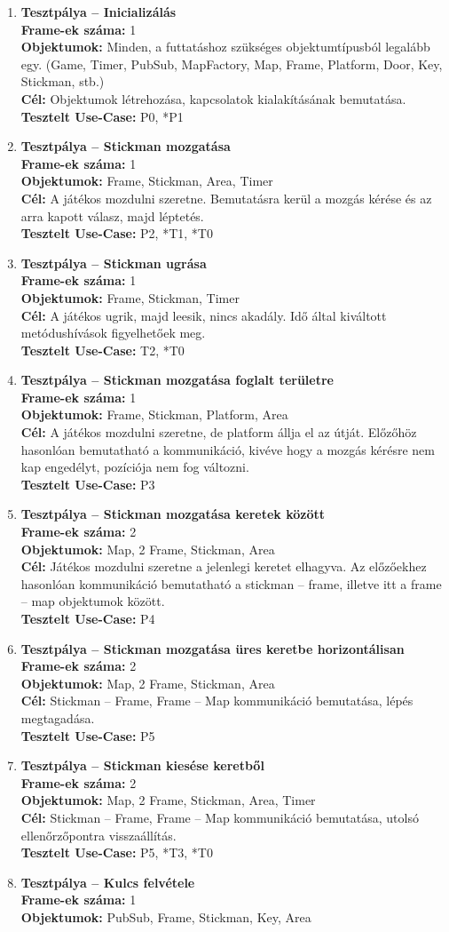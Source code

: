 		\begin{enumerate}[label=\textbf{\arabic*.}, start=0]
		
			\newcommand{\testitem}[1]{\item \textbf{Tesztpálya -- #1}\\}
			\newcommand{\tframe}[1]{\textbf{Frame-ek száma:} #1\\}
			\newcommand{\tobjekt}[1]{\textbf{Objektumok:} #1\\}
			\newcommand{\tcel}[1]{\textbf{Cél:} #1\\}
			\newcommand{\tuse}[1]{\textbf{Tesztelt Use-Case:} #1\\}
		
			\testitem{Inicializálás}
				\tframe{1}
				\tobjekt{Minden, a futtatáshoz szükséges objektumtípusból legalább egy.
					(Game, Timer, PubSub, MapFactory, Map, Frame, Platform, Door, Key, Stickman, stb.)}
				\tcel{Objektumok létrehozása, kapcsolatok kialakításának bemutatása.}
				\tuse{P0, *P1}
			\testitem{Stickman mozgatása}
				\tframe{1}
				\tobjekt{Frame, Stickman, Area, Timer}
				\tcel{A játékos mozdulni szeretne. Bemutatásra kerül a mozgás kérése és az arra kapott válasz, majd léptetés.} 
				\tuse{P2, *T1, *T0}
			\testitem{Stickman ugrása}
				\tframe{1}
				\tobjekt{Frame, Stickman, Timer}
				\tcel{A játékos ugrik, majd leesik, nincs akadály. Idő által kiváltott metódushívások figyelhetőek meg.} 
				\tuse{T2, *T0}
			\testitem{Stickman mozgatása foglalt területre}
				\tframe{1}
				\tobjekt{Frame, Stickman, Platform, Area}
				\tcel{A játékos mozdulni szeretne, de platform állja el az útját. Előzőhöz hasonlóan bemutatható a kommunikáció, kivéve hogy a mozgás kérésre nem kap engedélyt, pozíciója nem fog változni.}
				\tuse{P3}
			\testitem{Stickman mozgatása keretek között}
				\tframe{2}
				\tobjekt{Map, 2 Frame, Stickman, Area}
				\tcel{Játékos mozdulni szeretne a jelenlegi keretet elhagyva. Az előzőekhez hasonlóan kommunikáció bemutatható a stickman -- frame, illetve itt a frame -- map objektumok között.}
				\tuse{P4}
			\testitem{Stickman mozgatása üres keretbe horizontálisan}
				\tframe{2}
				\tobjekt{Map, 2 Frame, Stickman, Area}
				\tcel{Stickman -- Frame, Frame -- Map kommunikáció bemutatása, lépés megtagadása.}
				\tuse{P5}
			\testitem{Stickman kiesése keretből}
				\tframe{2}
				\tobjekt{Map, 2 Frame, Stickman, Area, Timer}
				\tcel{Stickman -- Frame, Frame -- Map kommunikáció bemutatása, utolsó ellenőrzőpontra visszaállítás.}
				\tuse{P5, *T3, *T0}
			\testitem{Kulcs felvétele}
				\tframe{1}
				\tobjekt{PubSub, Frame, Stickman, Key, Area}

\end{enumerate}
